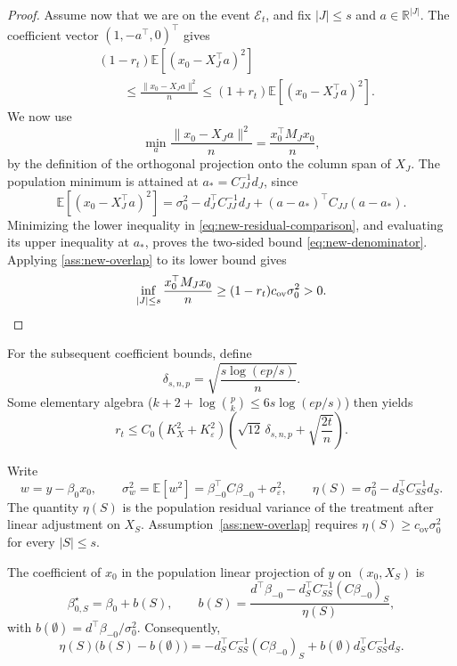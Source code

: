\documentclass[a4paper,10pt,english]{article}
\theoremstyle{definition}
\begin{document}
\begin{review}
\begin{proof}
Assume now that we are on the event \(\mathcal E_t\), and fix
\(|J|\le s\) and \(a\in\mathbb R^{|J|}\).
\rbreak
The coefficient vector \((1,-a^\top,0)^\top\) gives
\begin{equation}\label{eq:new-residual-comparison}
 \begin{aligned}
 &(1-r_t)\mathbb E[(x_0-X_J^\top a)^2]\\
 &\qquad\le\frac{\|x_0-X_Ja\|^2}{n}
 \le(1+r_t)\mathbb E[(x_0-X_J^\top a)^2].
 \end{aligned}
\end{equation}
\rbreak
We now use
\[
 \min_a\frac{\|x_0-X_Ja\|^2}{n}
 =\frac{x_0^\top M_Jx_0}{n},
\]
by the definition of the orthogonal projection onto the column span of
\(X_J\).
\rbreak
The population minimum is attained at \(a_*=C_{JJ}^{-1}d_J\), since
\[
 \mathbb E[(x_0-X_J^\top a)^2]
 =\sigma_0^2-d_J^\top C_{JJ}^{-1}d_J
 +(a-a_*)^\top C_{JJ}(a-a_*).
\]
\rbreak
Minimizing the lower inequality in
\eqref{eq:new-residual-comparison}, and evaluating its upper inequality
at \(a_*\), proves the two-sided bound \eqref{eq:new-denominator}.
\rbreak
Applying \eqref{ass:new-overlap} to its lower bound gives
\[
 \inf_{|J|\le s}\frac{x_0^\top M_Jx_0}{n}
 \ge(1-r_t)c_{\mathrm{ov}}\sigma_0^2>0.\qedhere
\]
\end{proof}

For the subsequent coefficient bounds, define
\begin{equation}\label{eq:new-delta}
 \delta_{s,n,p}=\sqrt{\frac{s\log(ep/s)}n}.
\end{equation}
\rbreak
Some elementary algebra
(\(k+2+\log\binom pk\le6s\log(ep/s)\)) then yields
\begin{equation}\label{eq:new-radius-rate}
 r_t\le C_0(K_X^2+K_\varepsilon^2)
 \left(\sqrt{12}\,\delta_{s,n,p}+\sqrt{\frac{2t}{n}}\right).
\end{equation}

Write
\[
 w=y-\beta_0x_0,\qquad
 \sigma_w^2=\mathbb E[w^2]
 =\beta_{-0}^\top C\beta_{-0}+\sigma_\varepsilon^2,\qquad
 \eta(S)=\sigma_0^2-d_S^\top C_{SS}^{-1}d_S.
\]
\rbreak
The quantity \(\eta(S)\) is the population residual variance of the
treatment after linear adjustment on \(X_S\).
\rbreak
Assumption~\eqref{ass:new-overlap} requires
\(\eta(S)\ge c_{\mathrm{ov}}\sigma_0^2\) for every \(|S|\le s\).

The coefficient of \(x_0\) in the population linear projection of \(y\)
on \((x_0,X_S)\) is
\begin{equation}\label{eq:new-population-coefficient}
 \beta^\star_{0,S}=\beta_0+b(S),\qquad
 b(S)=
 \frac{
 d^\top\beta_{-0}
 -d_S^\top C_{SS}^{-1}(C\beta_{-0})_S
 }{\eta(S)},
\end{equation}
with \(b(\emptyset)=d^\top\beta_{-0}/\sigma_0^2\).
\rbreak
Consequently,
\begin{equation}\label{eq:new-population-change}
 \eta(S)\bigl(b(S)-b(\emptyset)\bigr)
 =
 -d_S^\top C_{SS}^{-1}(C\beta_{-0})_S
 +b(\emptyset)d_S^\top C_{SS}^{-1}d_S.
\end{equation}


\end{review}
\end{document}
